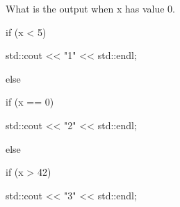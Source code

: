 What is the output when x has value 0.

\begin{console}

if (x < 5)

{

    std::cout << "1" << std::endl;

}

else

{

    if (x == 0)

    {

        std::cout << "2" << std::endl;

    }

    else

    {

        if (x > 42)

        {

            std::cout << "3" << std::endl;

        }

    }

}

\end{console}

